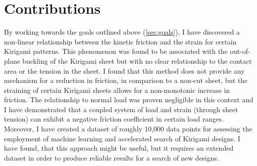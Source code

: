 






\section{Contributions}
By working towards the goals outlined above (\cref{sec:goals}), I have
discovered a non-linear relationship between the kinetic friction and the strain
for certain Kirigami patterns. This phenomenon was found to be associated with
the out-of-plane buckling of the Kirigami sheet but with no clear relationship
to the contact area or the tension in the sheet. I found that this method does
not provide any mechanism for a reduction in friction, in comparison to a
non-cut sheet, but the straining of certain Kirigami sheets allows for a non-monotonic increase in friction. The relationship to normal load was proven
negligible in this context and I have demonstrated that a coupled system
of load and strain (through sheet tension) can exhibit a negative friction
coefficient in certain load ranges. Moreover, I have created a dataset of roughly 10,000 data points for assessing the employment of machine learning and accelerated search of Kirigami designs. I have found, that this approach might be useful, but it requires an extended dataset in order to produce reliable results for a search of new designs.

